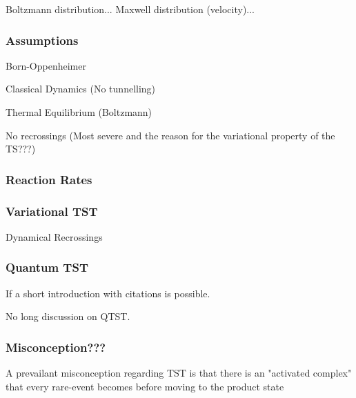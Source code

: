 Boltzmann distribution...
Maxwell distribution (velocity)...

\incomplete

\subsubsection{Assumptions}
\bit
\item Born-Oppenheimer
\item Classical Dynamics (No tunnelling)
\item Thermal Equilibrium (Boltzmann)
\item No recrossings (Most severe and the reason for the variational property of the TS???)
\eit
\placeholder

\subsubsection{Reaction Rates}
\placeholder

\subsubsection{Variational TST}
\bit
\item Dynamical Recrossings
\eit

\subsubsection{Quantum TST}
\bit
\item If a short introduction with citations is possible.
\item No long discussion on QTST.
\eit

\subsubsection{Misconception???}
A prevailant misconception regarding TST is that there is an "activated complex" that every rare-event becomes before moving to the product state

\placeholder

